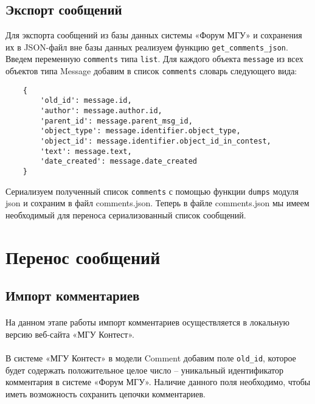 \documentclass[12pt, a4paper, oneside]{article}
\begin{document}
\subsection{Экспорт сообщений}
Для экспорта сообщений из базы данных системы «Форум МГУ» и сохранения их в JSON-файл вне базы данных реализуем функцию \texttt{get\_comments\_json}. Введем переменную \texttt{comments} типа \texttt{list}. Для каждого объекта \texttt{message} из всех объектов типа Message добавим в список \texttt{comments} словарь следующего вида:
\begin{verbatim}
    {
        'old_id': message.id,
        'author': message.author.id,
        'parent_id': message.parent_msg_id,
        'object_type': message.identifier.object_type,
        'object_id': message.identifier.object_id_in_contest,
        'text': message.text,
        'date_created': message.date_created
    }
\end{verbatim}
Сериализуем полученный список \texttt{comments} с помощью функции \texttt{dumps} модуля json и сохраним в файл comments.json. Теперь в файле comments.json мы имеем необходимый для переноса сериализованный список сообщений.
\vspace{1cm}

\newpage

\section{Перенос сообщений}
\subsection{Импорт комментариев}
\paragraph{}
На данном этапе работы импорт комментариев осуществляется в локальную версию веб-сайта «МГУ Контест».
\paragraph{}
В системе «МГУ Контест» в модели Comment добавим поле \texttt{old\_id}, которое будет содержать положительное целое число – уникальный идентификатор комментария в системе «Форум МГУ». Наличие данного поля необходимо, чтобы иметь возможность сохранить цепочки комментариев.
\end{document}
